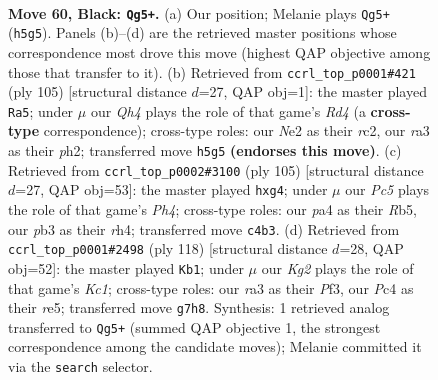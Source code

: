 \documentclass[11pt]{article}
\begin{document}
\clearpage

\begin{figure}[p]\centering
\begin{subfigure}{0.46\textwidth}\centering
\resizebox{\linewidth}{!}{%
\newchessgame
\chessboard[
  setfen={8/p5k1/1p6/7q/P1p5/RP6/4n1K1/8 b - - 3 60},
  showmover=false,
  pgfstyle=straightmove, color=movearrow, markmove={h5-g5}
]}
\caption{}
\end{subfigure}\hfill
\begin{subfigure}{0.46\textwidth}\centering
\resizebox{\linewidth}{!}{%
\newchessgame
\chessboard[
  setfen={4k3/8/8/3r1p2/2K3pp/P5P1/2R4P/8 b - - 1 53},
  showmover=false,
  pgfstyle=straightmove, color=movearrow, markmove={d5-a5}
]}
\caption{}
\end{subfigure}
\\[4pt]
\begin{subfigure}{0.46\textwidth}\centering
\resizebox{\linewidth}{!}{%
\newchessgame
\chessboard[
  setfen={8/6p1/5p2/1r5p/6PR/2k4P/5K2/8 b - - 0 53},
  showmover=false,
  pgfstyle=straightmove, color=movearrow, markmove={h5-g4}
]}
\caption{}
\end{subfigure}\hfill
\begin{subfigure}{0.46\textwidth}\centering
\resizebox{\linewidth}{!}{%
\newchessgame
\chessboard[
  setfen={8/8/1R6/4rp2/2k1P2P/p4P2/8/2K5 w - - 0 60},
  showmover=false,
  pgfstyle=straightmove, color=movearrow, markmove={c1-b1}
]}
\caption{}
\end{subfigure}
\caption{\textbf{Move 60, Black: \texttt{Qg5+}.} (a) Our position; Melanie plays \texttt{Qg5+} (\texttt{h5g5}). Panels (b)--(d) are the retrieved master positions whose correspondence most drove this move (highest QAP objective among those that transfer to it). (b) Retrieved from \texttt{ccrl\_top\_p0001\#421} (ply 105) [structural distance $d$=27, QAP obj=1]: the master played \texttt{Ra5}; under $\mu$ our \emph{Qh4} plays the role of that game's \emph{Rd4} (a \textbf{cross-type} correspondence); cross-type roles: our \emph{N}e2 as their \emph{r}c2, our \emph{r}a3 as their \emph{p}h2; transferred move \texttt{h5g5} \textbf{(endorses this move)}. (c) Retrieved from \texttt{ccrl\_top\_p0002\#3100} (ply 105) [structural distance $d$=27, QAP obj=53]: the master played \texttt{hxg4}; under $\mu$ our \emph{Pc5} plays the role of that game's \emph{Ph4}; cross-type roles: our \emph{p}a4 as their \emph{R}b5, our \emph{p}b3 as their \emph{r}h4; transferred move \texttt{c4b3}. (d) Retrieved from \texttt{ccrl\_top\_p0001\#2498} (ply 118) [structural distance $d$=28, QAP obj=52]: the master played \texttt{Kb1}; under $\mu$ our \emph{Kg2} plays the role of that game's \emph{Kc1}; cross-type roles: our \emph{r}a3 as their \emph{P}f3, our \emph{P}c4 as their \emph{r}e5; transferred move \texttt{g7h8}. Synthesis: 1 retrieved analog transferred to \texttt{Qg5+} (summed QAP objective 1, the strongest correspondence among the candidate moves); Melanie committed it via the \texttt{search} selector.}
\label{fig:thought-m119}
\end{figure}
\end{document}
